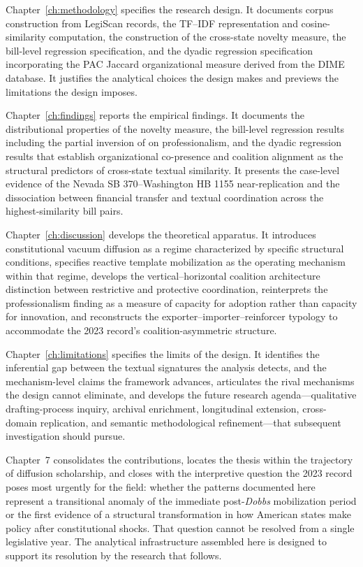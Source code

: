 Chapter~\ref{ch:methodology} specifies the research design. It documents corpus construction from LegiScan records, the TF--IDF representation and cosine-similarity computation, the construction of the cross-state novelty measure, the bill-level regression specification, and the dyadic regression specification incorporating the PAC Jaccard organizational measure derived from the DIME database. It justifies the analytical choices the design makes and previews the limitations the design imposes.

Chapter~\ref{ch:findings} reports the empirical findings. It documents the distributional properties of the novelty measure, the bill-level regression results including the partial inversion of \textcite{squireMeasuringStateLegislative2007} on professionalism, and the dyadic regression results that establish organizational co-presence and coalition alignment as the structural predictors of cross-state textual similarity. It presents the case-level evidence of the Nevada SB 370--Washington HB 1155 near-replication and the dissociation between financial transfer and textual coordination across the highest-similarity bill pairs.

Chapter~\ref{ch:discussion} develops the theoretical apparatus. It introduces constitutional vacuum diffusion as a regime characterized by specific structural conditions, specifies reactive template mobilization as the operating mechanism within that regime, develops the vertical--horizontal coalition architecture distinction between restrictive and protective coordination, reinterprets the professionalism finding as a measure of capacity for adoption rather than capacity for innovation, and reconstructs the exporter--importer--reinforcer typology to accommodate the 2023 record's coalition-asymmetric structure.

Chapter~\ref{ch:limitations} specifies the limits of the design. It identifies the inferential gap between the textual signatures the analysis detects, and the mechanism-level claims the framework advances, articulates the rival mechanisms the design cannot eliminate, and develops the future research agenda---qualitative drafting-process inquiry, archival enrichment, longitudinal extension, cross-domain replication, and semantic methodological refinement---that subsequent investigation should pursue.

Chapter~7 consolidates the contributions, locates the thesis within the trajectory of diffusion scholarship, and closes with the interpretive question the 2023 record poses most urgently for the field: whether the patterns documented here represent a transitional anomaly of the immediate post-\textit{Dobbs} mobilization period or the first evidence of a structural transformation in how American states make policy after constitutional shocks. That question cannot be resolved from a single legislative year. The analytical infrastructure assembled here is designed to support its resolution by the research that follows.